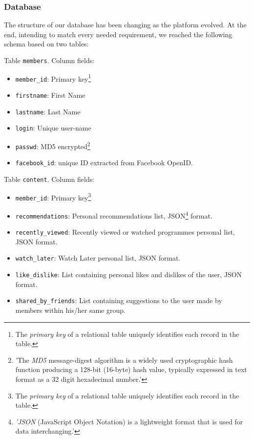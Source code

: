 \documentclass{acm_proc_article-sp}
\begin{document}
\subsubsection{Database}

The structure of our database has been changing as the platform evolved. At the end, intending to match every needed requirement, we reached the following schema based on two tables:

Table \texttt{members}. Column fields:

\begin{itemize}
\item \texttt{member\_id}: Primary key\footnote{The \textit{primary key} of a relational table uniquely identifies each record in the table.}
\item \texttt{firstname}: First Name
\item \texttt{lastname}: Last Name
\item \texttt{login}: Unique user-name
\item \texttt{passwd}: MD5 encrypted\cite{wiki:md5}\footnote{'The \textit{MD5} message-digest algorithm is a widely used cryptographic hash function producing a 128-bit (16-byte) hash value, typically expressed in text format as a 32 digit hexadecimal number.'}
\item \texttt{facebook\_id}: unique ID extracted from Facebook OpenID.
\end{itemize}

Table \texttt{content}. Column fields:

\begin{itemize}
\item \texttt{member\_id}: Primary key\footnote{The \textit{primary key} of a relational table uniquely identifies each record in the table.}
\item \texttt{recommendations}: Personal recommendations list, JSON\footnote{\textit{'JSON} (JavaScript Object Notation) is a lightweight format that is used for data interchanging.'} format.
\item \texttt{recently\_viewed}: Recently viewed or watched programmes personal list, JSON format.
\item \texttt{watch\_later}: Watch Later personal list, JSON format.
\item \texttt{like\_dislike}: List containing personal likes and dislikes of the user, JSON format.
\item \texttt{shared\_by\_friends}: List containing suggestions to the user made by members within his/her same group. 
\end{itemize}
\end{document}
